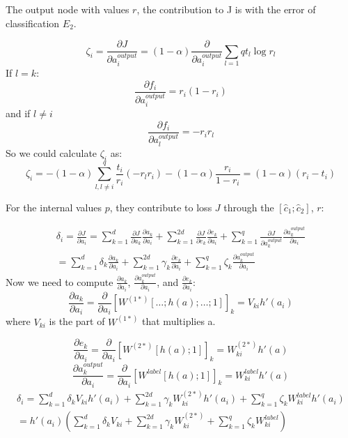 \documentclass[twoside,12pt]{article}
\begin{document}
The output node with values $r$, the contribution to J is with the error of classification $E_2$.

\begin{equation}
\zeta_i=\frac{\partial J}{\partial a^{output}_i}=(1-\alpha)\frac{\partial }{\partial a^{output}_i}\sum_{l=1}{q}t_l\log{r_l}
\end{equation}
If $l=k$:
\begin{equation}
\frac{\partial f_i}{\partial a^{output}_{i}}=r_i(1-r_i)
\end{equation}
and if $l\neq i$
\begin{equation}
\frac{\partial f_i}{\partial a^{output}_{l}}=-r_ir_l
\end{equation}
So we could calculate $\zeta_i$ as:
\begin{equation}
\zeta_i = -(1-\alpha)\sum_{l,l\neq i}^q\frac{t_i}{r_i}(-r_lr_i)-(1-\alpha)\frac{r_i}{1-r_i}=(1-\alpha)(r_i-t_i)
\end{equation}

For the internal values $p$, they contribute to loss $J$ through the $[\hat{c}_1;\hat{c}_2]$, $r$:

\begin{align}
\delta_i=\frac{\partial J}{\partial a_i}=\sum_{k=1}^{d}\frac{\partial J}{\partial a_k}\frac{\partial a_k}{\partial a_i}+\sum_{k=1}^{2d}\frac{\partial J}{\partial e_k}\frac{\partial e_k}{\partial a_i}+\sum_{k=1}^{q}\frac{\partial J}{\partial a^{output}_k}\frac{\partial a^{output}_k}{\partial a_i} \\
= \sum_{k=1}^{d}\delta_k\frac{\partial a_k}{\partial a_i}+\sum_{k=1}^{2d}\gamma_k\frac{\partial e_k}{\partial a_i}+\sum_{k=1}^{q}\zeta_k\frac{\partial a^{output}_k}{\partial a_i}
\end{align}
Now we need to compute $\frac{\partial a_k}{\partial a_i}$, $\frac{\partial a^{output}_k}{\partial a_i}$, and $\frac{\partial e_k}{\partial a_i}$:
\begin{equation}
\frac{\partial a_k}{\partial a_i}=\frac{\partial}{\partial a_i}[W^{(1*)}[\ldots;h(a);\ldots;1]]_k=V_{ki}h'(a_i)
\end{equation}
where $V_{ki}$ is the part of $W^{(1*)}$ that multiplies a.

\begin{equation}
\frac{\partial e_k}{\partial a_i}=\frac{\partial}{\partial a_i}[W^{(2*)}[h(a);1]]_k = W^{(2*)}_{ki}h'(a)
\end{equation}
\begin{equation}
\frac{\partial a^{output}_k}{\partial a_i}=\frac{\partial }{\partial a_i}[W^{label}[h(a);1]]_k=W^{label}_{ki}h'(a)
\end{equation}
\begin{align}
\delta_i=\sum_{k=1}^{d}\delta_kV_{ki}h'(a_i)+\sum_{k=1}^{2d}\gamma_kW^{(2*)}_{ki}h'(a_i)+\sum_{k=1}^q \zeta_k W^{label}_{ki}h'(a_i)\\
=h'(a_i)(\sum_{k=1}^{d}\delta_kV_{ki}+\sum_{k=1}^{2d}\gamma_kW^{(2*)}_{ki}+\sum_{k=1}^q \zeta_k W^{label}_{ki})
\end{align}
\end{document}
